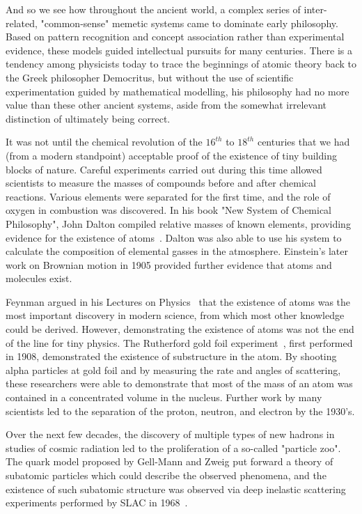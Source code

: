 And so we see how throughout the ancient world, a complex series of inter-related, "common-sense" memetic systems came to dominate early philosophy. Based on pattern recognition and concept association rather than experimental evidence, these models guided intellectual pursuits for many centuries. There is a tendency among physicists today to trace the beginnings of atomic theory back to the Greek philosopher Democritus, but without the use of scientific experimentation guided by mathematical modelling, his philosophy had no more value than these other ancient systems, aside from the somewhat irrelevant distinction of ultimately being correct.

It was not until the chemical revolution of the $16^{th}$ to $18^{th}$ centuries that we had (from a modern standpoint) acceptable proof of the existence of tiny building blocks of nature. Careful experiments carried out during this time allowed scientists to measure the masses of compounds before and after chemical reactions. Various elements were separated for the first time, and the role of oxygen in combustion was discovered. In his book "New System of Chemical Philosophy", John Dalton compiled relative masses of known elements, providing evidence for the existence of atoms~\cite{new_system_chemical}. Dalton was also able to use his system to calculate the composition of elemental gasses in the atmosphere. Einstein's later work on Brownian motion in 1905 provided further evidence that atoms and molecules exist.

Feynman argued in his Lectures on Physics~\cite{feynman1965flp} that the existence of atoms was the most important discovery in modern science, from which most other knowledge could be derived. However, demonstrating the existence of atoms was not the end of the line for tiny physics. The Rutherford gold foil experiment~\cite{Rutherford}, first performed in 1908, demonstrated the existence of substructure in the atom. By shooting alpha particles at gold foil and by measuring the rate and angles of scattering, these researchers were able to demonstrate that most of the mass of an atom was contained in a concentrated volume in the nucleus. Further work by many scientists led to the separation of the proton, neutron, and electron by the 1930's.

Over the next few decades, the discovery of multiple types of new hadrons in studies of cosmic radiation led to the proliferation of a so-called "particle zoo". The quark model proposed by Gell-Mann and Zweig put forward a theory of subatomic particles which could describe the observed phenomena, and the existence of such subatomic structure was observed via deep inelastic scattering experiments performed by SLAC in 1968~\cite{SLAC_quark}.

